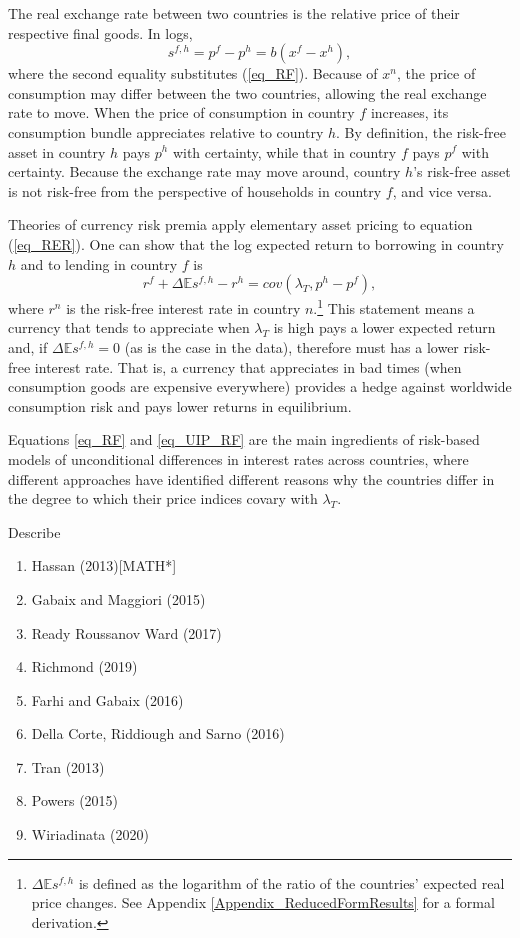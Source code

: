 \documentclass[12pt,letter]{article}
\theoremstyle{break} \theorembodyfont{\normalfont\itshape}
\theoremstyle{break}
\theoremstyle{break} \theorembodyfont{\normalfont\itshape}
\theoremstyle{break} \theorembodyfont{\normalfont\itshape}
\begin{document}
The real exchange rate between two countries is the relative price of
their respective final goods. In logs,
\begin{equation}
  s^{f,h}=p^{f}-p^{h}=b(x^{f}-x^{h}),
\end{equation}\label{eq_RER}
where the second equality substitutes (\ref{eq_RF}). Because of
$x^{n}$, the price of consumption may differ between the two
countries, allowing the real exchange rate to move. When the price of
consumption in country $f$ increases, its consumption bundle
appreciates relative to country $h$. By definition, the risk-free
asset in country $h$ pays $p^h$ with certainty, while that in country
$f$ pays $p^f$ with certainty. Because the exchange rate may move
around, country $h$'s risk-free asset is not risk-free from the
perspective of households in country $f$, and vice versa.

Theories of currency risk premia apply elementary asset pricing to
equation (\ref{eq_RER}). One can show that the log expected return to
borrowing in country $h$ and to lending in country $f$ is
\begin{equation}
  r^{f} + \Delta \mathbb{E} s^{f,h} - r^{h} =cov\left( \lambda _{T},p^{h}-p^{f}\right),
  \label{eq_UIP_RF}
\end{equation}%
where $r^{n}$ is the risk-free interest rate in country
$n$.\footnote{$\Delta\mathbb{E}s^{f,h}$ is defined as the logarithm of
  the ratio of the countries' expected real price changes. See
  Appendix \ref{Appendix_ReducedFormResults} for a formal derivation.}
This statement means a currency that tends to appreciate when
$\lambda_T$ is high pays a lower expected return and, if
$\Delta \mathbb{E} s^{f,h}=0$ (as is the case in the data), therefore
must has a lower risk-free interest rate. That is, a currency that
appreciates in bad times (when consumption goods are expensive
everywhere) provides a hedge against worldwide consumption risk and
pays lower returns in equilibrium.

Equations \eqref{eq_RF} and \eqref{eq_UIP_RF} are the main ingredients
of risk-based models of unconditional differences in interest rates
across countries, where different approaches have identified different
reasons why the countries differ in the degree to which their price
indices covary with $\lambda_T$.

Describe
\begin{enumerate}
\item Hassan (2013)[MATH*]
\item Gabaix and Maggiori (2015)
\item Ready Roussanov Ward (2017)
\item Richmond (2019)
\item Farhi and Gabaix (2016)
\item Della Corte, Riddiough and Sarno (2016)
\item Tran (2013)
\item Powers (2015)
\item Wiriadinata (2020)
\end{enumerate}
\end{document}
